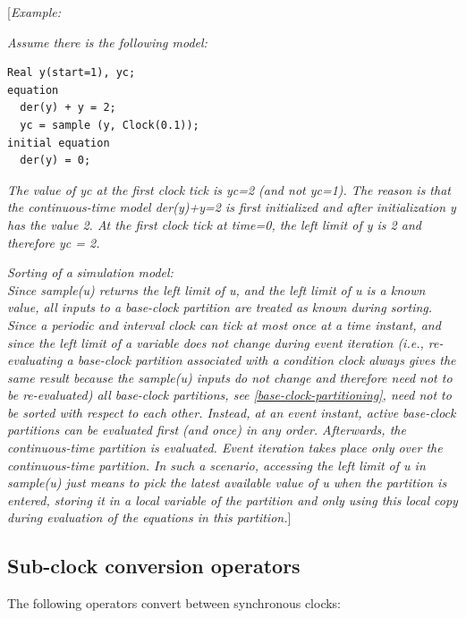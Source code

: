 \documentclass[10pt,a4paper]{report}
\def\doublelabel#1{\label{#1}}
\begin{document}
{[}\emph{Example: }

\emph{Assume there is the following model:}

\begin{lstlisting}[language=modelica]
  Real y(start=1), yc;
equation
  der(y) + y = 2;
  yc = sample (y, Clock(0.1));
initial equation
  der(y) = 0;
\end{lstlisting}
\emph{The value of yc at the first clock tick is yc=2 (and not yc=1).
The reason is that the continuous-time model der(y)+y=2 is first
initialized and after initialization y has the value 2. At the first
clock tick at time=0, the left limit of y is 2 and therefore yc = 2.}

\emph{Sorting of a simulation model:\\
Since sample(u) returns the left limit of u, and the left limit of u is
a known value, all inputs to a base-clock partition are treated as known
during sorting. Since a periodic and interval clock can tick at most
once at a time instant, and since the left limit of a variable does not
change during event iteration (i.e., re-evaluating a base-clock
partition associated with a condition clock always gives the same result
because the sample(u) inputs do not change and therefore need not to be
re-evaluated) all base-clock partitions, see \ref{base-clock-partitioning}, need
not to be sorted with respect to each other. Instead, at an event
instant, active base-clock partitions can be evaluated first (and once)
in any order. Afterwards, the continuous-time partition is evaluated.
Event iteration takes place only over the continuous-time partition. In
such a scenario, accessing the left limit of u in sample(u) just means
to pick the latest available value of u when the partition is entered,
storing it in a local variable of the partition and only using this
local copy during evaluation of the equations in this partition.}{]}

\subsection{Sub-clock conversion operators}\doublelabel{sub-clock-conversion-operators}

The following operators convert between synchronous clocks:
\end{document}
